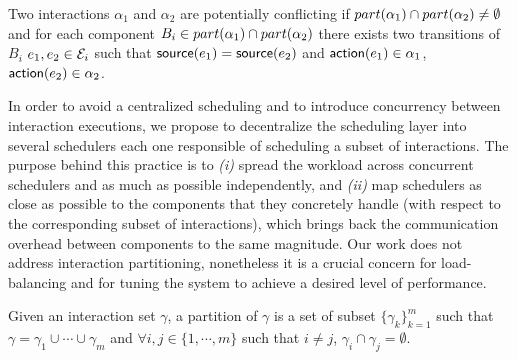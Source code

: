 \begin{definition}\label{def:pconf}
  Two interactions $\alpha_1$ and $\alpha_2$ are potentially conflicting if 
  $part(\alpha_1)\cap part(\alpha_2)\neq\emptyset$ and for each component $B_i\in part(\alpha_1)\cap
  part(\alpha_2)$ there exists two transitions of $B_i$ 
  $e_1,e_2\in\mathcal{E}_i$ such that $\textsf{source}(e_1)=\textsf{source}(e_2)$ and $\textsf{action}(e_1)\in\alpha_1$,
  $\textsf{action}(e_2)\in\alpha_2$.
\end{definition}


In order to avoid a centralized scheduling and to introduce concurrency between interaction
executions, we propose to decentralize the scheduling layer into several schedulers each one
responsible of scheduling a subset of interactions. The purpose behind this practice is to 
\emph{(i)} spread the workload across concurrent schedulers and
as much as possible independently, and \emph{(ii)} map schedulers as close as possible to 
the components that they concretely handle (with respect to the corresponding subset of 
interactions), which brings back the communication overhead between components to the same 
magnitude. Our work does not address interaction partitioning, nonetheless it is a crucial 
concern for load-balancing and for tuning the system to achieve a desired level of performance. 

\begin{definition}\label{def:inter_part}
  Given an interaction set $\gamma$, a partition of $\gamma$ is a set of subset 
  $\{\gamma_k\}_{k=1}^m$ such that $\gamma=\gamma_1\cup\cdots\cup\gamma_m$ and 
  $\forall i,j\in\{1,\cdots,m\}$ such that $i\neq j$, $\gamma_i\cap\gamma_j=\emptyset$.
\end{definition}

